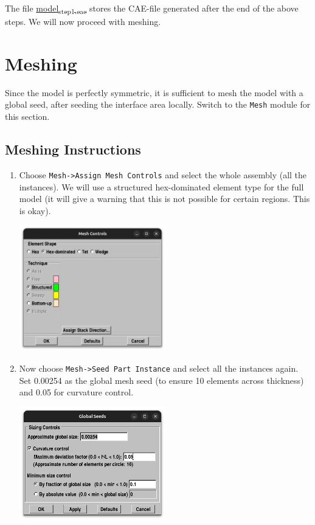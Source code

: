 \documentclass[11pt]{article}
\begin{document}
The file \href{https://github.com/Nidish96/Abaqus4Joints/blob/main/assets/assembly/model\_step1.cae}{model\textsubscript{step1.cae}} stores the CAE-file generated after the end of the above steps.
We will now proceed with meshing.
\section{Meshing}
\label{sec:orgb026244}
Since the model is perfectly symmetric, it is sufficient to mesh the model with a global seed, after seeding the interface area locally.
Switch to the \texttt{Mesh} module for this section.
\subsection{Meshing Instructions}
\label{sec:orgdeb612c}
\begin{enumerate}
\item Choose \texttt{Mesh->Assign Mesh Controls} and select the whole assembly (all the instances).
We will use a structured hex-dominated element type for the full model (it will give a warning that this is not possible for certain regions. This is okay).
\begin{center}
\includegraphics[width=0.5\textwidth]{./figs/globmesh.png}
\end{center}
\item Now choose \texttt{Mesh->Seed Part Instance} and select all the instances again.
Set 0.00254 as the global mesh seed (to ensure 10 elements across thickness) and 0.05 for curvature control.
\begin{center}
\includegraphics[width=0.5\textwidth]{./figs/gmeshseed.png}

\end{center}
\end{enumerate}
\end{document}
